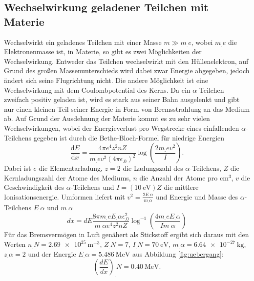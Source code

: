 \subsection{Wechselwirkung geladener Teilchen mit Materie}
\noindent Wechselwirkt ein geladenes Teilchen mit einer Masse $m\gg m_.e$, wobei $m_.e$ die Elektronenmasse ist, in Materie, so gibt es zwei Möglichkeiten der Wechselwirkung.
Entweder das Teilchen wechselwirkt mit den Hüllenelektron, auf Grund des großen Massenunterschieds wird dabei zwar Energie abgegeben, jedoch ändert sich seine Flugrichtung nicht. Die andere Möglichkeit ist eine Wechselwirkung mit dem Coulombpotential des Kerns. Da ein $\alpha$-Teilchen zweifach positiv geladen ist, wird es stark aus seiner Bahn ausgelenkt und gibt nur einen kleinen Teil seiner Energie in Form von Bremsstrahlung an das Medium ab.
Auf Grund der Ausdehnung der Materie kommt es zu sehr vielen Wechselwirkungen, wobei der Energieverlust pro Wegstrecke eines einfallenden $\alpha$-Teilchens gegeben ist durch die Bethe-Bloch-Formel für niedrige Energien
\begin{equation}
\frac{\mathrm{d}E}{\mathrm{d}x}=\frac{4\pi e^4z^2n Z}{m_.ev^2(4\pi\epsilon_.0)^2}\log{\left(\frac{2m_.ev^2}{I}\right)}\text{.}\label{eq:BBF}
\end{equation} 
Dabei ist $e$ die Elementarladung, $z=2$ die Ladungszahl des $\alpha$-Teilchens, $Z$ die Kernladungszahl der Atome des Mediums, $n$ die Anzahl der Atome pro $\si{\centi\meter^3}$, $v$ die Geschwindigkeit des $\alpha$-Teilchens und $I=(\SI{10}{\electronvolt})Z$ die mittlere Ionisationsenergie.
Umformen liefert mit $v^2=\frac{2E_.{\alpha}}{m_.{\alpha}}$ und Energie und Masse des $\alpha$-Teilchens $E_.{\alpha}$ und $m_.{\alpha}$
\begin{equation}
dx=dE\frac{8\pi m_.e E_.{\alpha}\epsilon^2_.0}{m_.{\alpha}e^4z^2nZ}\log^{-1}\left(\frac{4m_.e E_.{\alpha}}{Im_.{\alpha}}\right)\label{eq:dx}
\end{equation}
Für das Bremsvermögen in Luft genähert als Stickstoff ergibt sich daraus mit den Werten $n_.N = \SI{2,69e25}{\metre^{-3}}$, $Z_.N=7$, $I_.N=\SI{70}{\electronvolt}$, $m_.{\alpha}=\SI{6,64e-27}{\kilo\gram}$, $z_.{\alpha}=2$ und der Energie $E_.{\alpha}=\SI{5,486}{\mega\electronvolt}$ aus Abbildung \ref{fig:uebergang}:
\begin{equation*}
\left(\frac{dE}{dx}\right)_.{N}=\SI{0,40}{\mega\electronvolt}\text{.}
\end{equation*}


